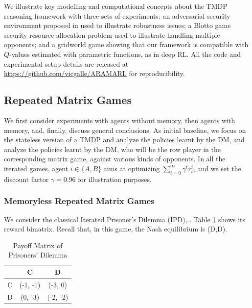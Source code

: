 We illustrate key modelling and computational concepts 
about the TMDP reasoning framework with three
sets of experiments:
an adversarial security environment proposed in \parencite{leike2017ai}
used to illustrate robustness issues; a Blotto game security resource allocation problem
used to illustrate handling multiple opponents; and a %
gridworld game showing that our framework is compatible with $Q$-values estimated with parametric functions, as in deep RL. %
All the code and experimental setup details
are released at \url{https://github.com/vicgalle/ARAMARL}
 for reproducibility.

\iffalse
\subsection{Repeated Matrix Games}
We first consider experiments with agents without memory,
then agents with memory, and, finally, discuss general conclusions.
As initial baseline, we focus on the stateless version of a TMDP and
analyze the policies learnt by the DM, and analyze the policies learnt by the DM,
who will be the row player in the corresponding matrix game, against various kinds of opponents.
In all the iterated games, agent  $ i \in \lbrace A, B \rbrace $ 
aims at optimizing 
$\sum_{t=0}^{\infty} \gamma^t r^i_{t}$, and we set 
the discount factor $\gamma = 0.96$ for illustration purposes. 
\subsubsection{Memoryless Repeated Matrix Games}\label{kk2}

We consider the classical Iterated Prisoner's Dilemma (IPD), \parencite{axelrod84}. Table \ref{tab:payoffIPD} shows its reward bimatrix. %
 Recall that, in this game, the Nash equilibrium is (D,D).

\begin{table}[h]
\begin{center}
\begin{tabular}{c|c|c}
\hline
 & C & D \\
\hline
C & (-1, -1) & (-3, 0) \\
\hline
D & (0, -3) & (-2, -2)  \\
\hline
\end{tabular}
\end{center}
\caption{Payoff Matrix of Prisoners' Dilemma}
\label{tab:payoffIPD}
\vspace{-2ex}
\end{table}

